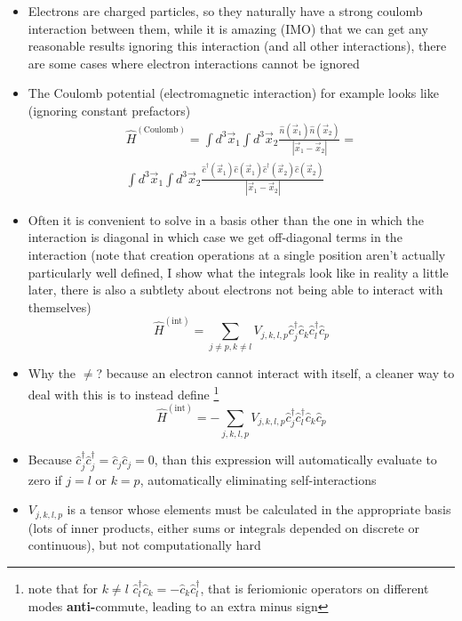 \documentclass[english]{article}
\begin{document}
\begin{itemize}
\section{Interacting Fermions}
\item Electrons are charged particles, so they naturally have a strong coulomb interaction between them, while it is amazing (IMO) that we can get any reasonable results ignoring this interaction (and all other interactions), there are some cases where electron interactions cannot be ignored
\item The Coulomb potential (electromagnetic interaction) for example looks like (ignoring constant prefactors)
\begin{align}
\hat{H}^{(\mathrm{Coulomb})}=\int d^3\vec{x}_1\int d^3\vec{x}_2\frac{\hat{n}(\vec{x}_1)\hat{n}(\vec{x}_2)}{|\vec{x}_1-\vec{x}_2|}=\\
\int d^3\vec{x}_1\int d^3\vec{x}_2\frac{\hat{c}^\dagger(\vec{x}_1)\hat{c}(\vec{x}_1)\hat{c}^\dagger(\vec{x}_2)\hat{c}(\vec{x}_2)}{|\vec{x}_1-\vec{x}_2|}
\end{align}
\item Often it is convenient to solve in a basis other than the one in which the interaction is diagonal in which case we get off-diagonal terms in the interaction (note that creation operations at a single position aren't actually particularly well defined, I show what the integrals look like in reality a little later, there is also a subtlety about electrons not being able to interact with themselves)
\begin{equation}
\hat{H}^{(\mathrm{int})}=\sum_{j\neq p,k \neq l}V_{j,k,l,p}\hat{c}^\dagger_j\hat{c}_k\hat{c}^\dagger_l\hat{c}_p
\end{equation}
\item Why the $\neq$? because an electron cannot interact with itself, a cleaner way to deal with this is to instead define \footnote{note that for $k \neq l$ $\hat{c}^\dagger_l\hat{c}_k=-\hat{c}_k\hat{c}^\dagger_l$, that is feriomionic operators on different modes \textbf{anti-}commute, leading to an extra minus sign}
\begin{equation}
\hat{H}^{(\mathrm{int})}=-\sum_{j,k,l,p}V_{j,k,l,p}\hat{c}^\dagger_j\hat{c}^\dagger_l\hat{c}_k\hat{c}_p
\end{equation}
\item Because $\hat{c}^\dagger_j\hat{c}^\dagger_j=\hat{c}_j\hat{c}_j=0$, than this expression will automatically evaluate to zero if $j=l$ or $k=p$, automatically eliminating self-interactions
\item $V_{j,k,l,p}$ is a tensor whose elements must be calculated in the appropriate basis (lots of inner products, either sums or integrals depended on discrete or continuous), but not computationally hard

\end{itemize}
\end{document}
